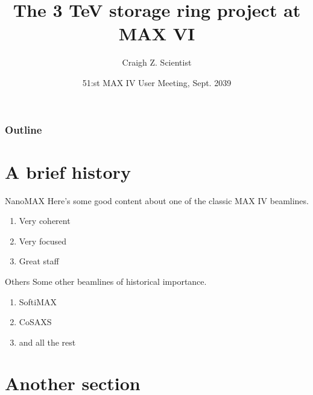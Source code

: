 \documentclass[aspectratio=43]{beamer}
\title{The 3 TeV storage ring project at MAX VI}
\author{Craigh Z. Scientist}
\date{51:st MAX IV User Meeting, Sept. 2039}
\begin{document}
  \begin{frame}
    \titlepage
  \end{frame}
  
  \begin{frame}
    \frametitle{Outline}
    \tableofcontents
  \end{frame}
  
  \section{A brief history}
    \sectionframe
    
    \begin{frame}{NanoMAX}
      Here's some good content about one of the classic MAX IV beamlines.
      \begin{enumerate}
        \item Very coherent
        \item Very focused
        \item Great staff
      \end{enumerate}
    \end{frame}

    \begin{frame}{Others}
      Some other beamlines of historical importance.
      \begin{enumerate}
        \item SoftiMAX
        \item CoSAXS
        \item and all the rest
      \end{enumerate}
    \end{frame}  

  \section{Another section}
    \sectionframe

  \logoframe %
\end{document}
